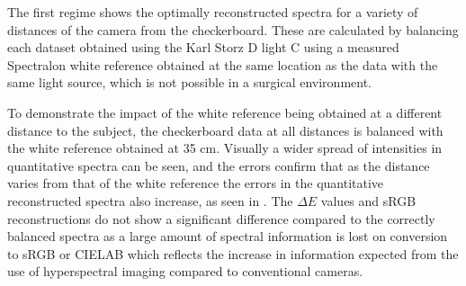 The first regime shows the optimally reconstructed spectra for a variety of distances of the camera from the checkerboard. These are calculated by balancing each dataset obtained using the Karl Storz D light C using a measured Spectralon white reference obtained at the same location as the data with the same light source, which is not possible in a surgical environment.

To demonstrate the impact of the white reference being obtained at a different distance to the subject, the checkerboard data at all distances is balanced with the white reference obtained at 35 cm. Visually a wider spread of intensities in quantitative spectra can be seen, and the errors confirm that as the distance varies from that of the white reference the errors in the quantitative reconstructed spectra also increase, as seen in . The $\Delta E$ values and sRGB reconstructions do not show a significant difference compared to the correctly balanced spectra as a large amount of spectral information is lost on conversion to sRGB or CIELAB which reflects the increase in information expected from the use of hyperspectral imaging compared to conventional cameras. 

